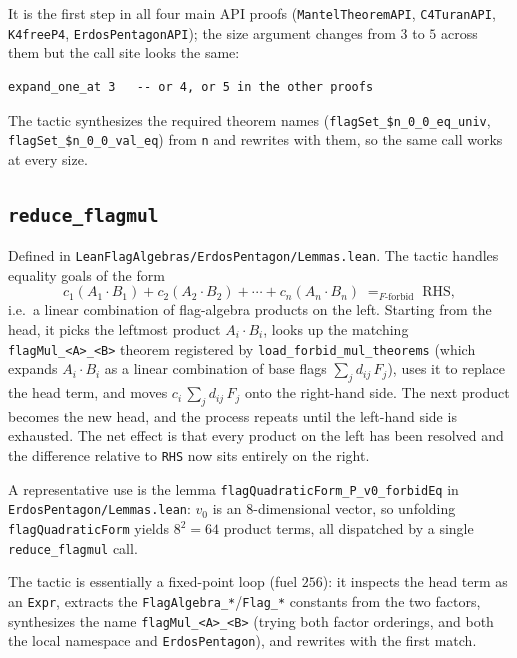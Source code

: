 \documentclass[11pt]{article}
\begin{document}
It is the first step in all four main API proofs
(\texttt{MantelTheoremAPI}, \texttt{C4TuranAPI}, \texttt{K4freeP4},
\texttt{ErdosPentagonAPI}); the size argument changes from $3$ to $5$
across them but the call site looks the same:

\begin{lstlisting}
expand_one_at 3   -- or 4, or 5 in the other proofs
\end{lstlisting}

The tactic synthesizes the required theorem names
(\texttt{flagSet\_\$n\_0\_0\_eq\_univ},
\texttt{flagSet\_\$n\_0\_0\_val\_eq}) from \texttt{n} and rewrites
with them, so the same call works at every size.

\subsection{\texttt{reduce\_flagmul}}

Defined in \texttt{LeanFlagAlgebras/ErdosPentagon/Lemmas.lean}. The
tactic handles equality goals of the form
\[
   c_1 (A_1 \cdot B_1) + c_2 (A_2 \cdot B_2) + \cdots + c_n (A_n \cdot B_n)
   \;=_{F\text{-forbid}}\; \mathrm{RHS},
\]
i.e.\ a linear combination of flag-algebra products on the left.
Starting from the head, it picks the leftmost product $A_i \cdot B_i$,
looks up the matching \texttt{flagMul\_<A>\_<B>} theorem registered by
\texttt{load\_forbid\_mul\_theorems} (which expands $A_i \cdot B_i$ as
a linear combination of base flags
$\sum_j d_{ij}\,F_j$), uses it to replace the head term, and moves
$c_i\,\sum_j d_{ij}\,F_j$ onto the right-hand side. The next product
becomes the new head, and the process repeats until the left-hand
side is exhausted. The net effect is that every product on the left
has been resolved and the difference relative to \texttt{RHS} now
sits entirely on the right.

A representative use is the lemma
\texttt{flagQuadraticForm\_P\_v0\_forbidEq} in
\texttt{ErdosPentagon/Lemmas.lean}: $v_0$ is an $8$-dimensional vector,
so unfolding \texttt{flagQuadraticForm} yields $8^2 = 64$ product
terms, all dispatched by a single \texttt{reduce\_flagmul} call.

The tactic is essentially a fixed-point loop (fuel $256$): it inspects
the head term as an \texttt{Expr}, extracts the
\texttt{FlagAlgebra\_*}/\texttt{Flag\_*} constants from the two
factors, synthesizes the name \texttt{flagMul\_<A>\_<B>} (trying both
factor orderings, and both the local namespace and
\texttt{ErdosPentagon}), and rewrites with the first match.
\end{document}
